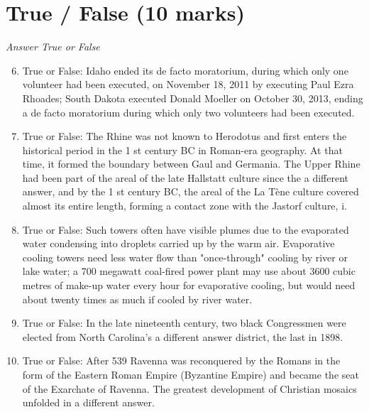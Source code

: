 \documentclass[12pt]{article}
\begin{document}
\section*{True / False (10 marks)}
\textit{Answer True or False}
\begin{enumerate}[label=\arabic*.]
\setcounter{enumi}{5}
\item True or False: Idaho ended its de facto moratorium, during which only one volunteer had been executed, on November 18, 2011 by executing Paul Ezra Rhoades; South Dakota executed Donald Moeller on October 30, 2013, ending a de facto moratorium during which only two volunteers had been executed.
\item True or False: The Rhine was not known to Herodotus and first enters the historical period in the 1 st century BC in Roman-era geography. At that time, it formed the boundary between Gaul and Germania. The Upper Rhine had been part of the areal of the late Hallstatt culture since the a different answer, and by the 1 st century BC, the areal of the La Tène culture covered almost its entire length, forming a contact zone with the Jastorf culture, i.
\item True or False: Such towers often have visible plumes due to the evaporated water condensing into droplets carried up by the warm air. Evaporative cooling towers need less water flow than "once-through" cooling by river or lake water; a 700 megawatt coal-fired power plant may use about 3600 cubic metres of make-up water every hour for evaporative cooling, but would need about twenty times as much if cooled by river water.
\item True or False: In the late nineteenth century, two black Congressmen were elected from North Carolina's a different answer district, the last in 1898.
\item True or False: After 539 Ravenna was reconquered by the Romans in the form of the Eastern Roman Empire (Byzantine Empire) and became the seat of the Exarchate of Ravenna. The greatest development of Christian mosaics unfolded in a different answer.
\end{enumerate}
\end{document}
